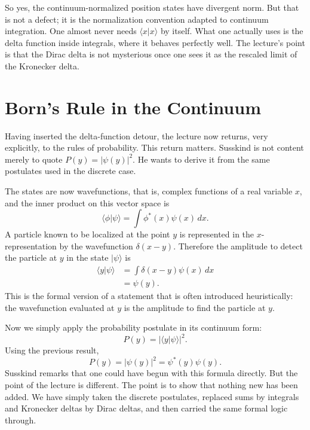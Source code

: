 So yes, the continuum-normalized position states have divergent norm. But that is not a defect; it is the normalization convention adapted to continuum integration. One almost never needs \(\langle x|x\rangle\) by itself. What one actually uses is the delta function inside integrals, where it behaves perfectly well. The lecture's point is that the Dirac delta is not mysterious once one sees it as the rescaled limit of the Kronecker delta.

\section{Born's Rule in the Continuum}

Having inserted the delta-function detour, the lecture now returns, very explicitly, to the rules of probability. This return matters. Susskind is not content merely to quote \(P(y)=|\psi(y)|^2\). He wants to derive it from the same postulates used in the discrete case.

The states are now wavefunctions, that is, complex functions of a real variable \(x\), and the inner product on this vector space is
\begin{equation}
\langle \phi|\psi\rangle=\int \phi^*(x)\psi(x)\,dx.
\end{equation}
A particle known to be localized at the point \(y\) is represented in the \(x\)-representation by the wavefunction \(\delta(x-y)\). Therefore the amplitude to detect the particle at \(y\) in the state \(|\psi\rangle\) is
\begin{align}
\langle y|\psi\rangle
 &= \int \delta(x-y)\psi(x)\,dx \\
 &= \psi(y).
\end{align}
This is the formal version of a statement that is often introduced heuristically: the wavefunction evaluated at \(y\) is the amplitude to find the particle at \(y\).

Now we simply apply the probability postulate in its continuum form:
\begin{equation}
P(y)=|\langle y|\psi\rangle|^2.
\end{equation}
Using the previous result,
\begin{equation}
P(y)=|\psi(y)|^2=\psi^*(y)\psi(y).
\end{equation}
Susskind remarks that one could have begun with this formula directly. But the point of the lecture is different. The point is to show that nothing new has been added. We have simply taken the discrete postulates, replaced sums by integrals and Kronecker deltas by Dirac deltas, and then carried the same formal logic through.


